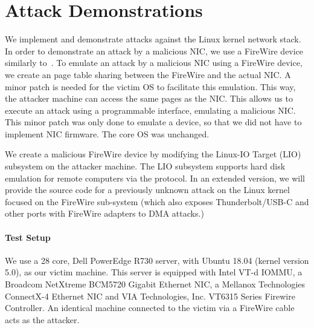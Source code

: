 \section{Attack Demonstrations}\label{Sec:setup}



We implement and demonstrate \compound attacks against the Linux kernel network stack. In order to demonstrate an attack by a malicious NIC, we use a FireWire device similarly to~\cite{SLND10}. To emulate an attack by a malicious NIC using a FireWire device, we create an \iova{} page table sharing between the FireWire and the actual NIC. A minor patch is needed for the victim OS to facilitate this emulation. This way, the attacker machine can access the same pages as the NIC. This allows us to execute an attack using a programmable interface, emulating a malicious NIC. This minor patch was only done to emulate a device, so that we did not have to implement NIC firmware. The core OS was unchanged.


We create a malicious FireWire device by modifying the Linux-IO Target (LIO) subsystem on the attacker machine. The LIO subsystem supports hard disk emulation for remote computers via the \spb{} protocol. In an extended version, we will provide the source code for a previously unknown \simple attack on the Linux kernel focused on the FireWire sub-system (which also exposes Thunderbolt/USB-C and other ports with FireWire adapters to DMA attacks.)


\paragraph{Test Setup}
We use a 28 core, Dell PowerEdge R730 server, with Ubuntu 18.04 (kernel version 5.0), as our victim machine. This server is equipped with Intel VT-d IOMMU, a Broadcom NetXtreme BCM5720 Gigabit Ethernet NIC, a Mellanox Technologies ConnectX-4 Ethernet NIC and VIA Technologies, Inc. VT6315 Series Firewire Controller. An identical machine connected to the victim via a FireWire cable acts as the attacker. 
